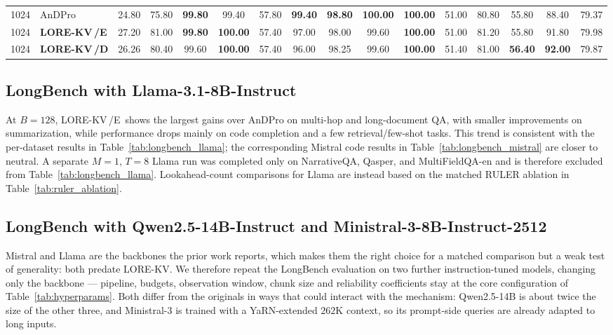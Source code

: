 \documentclass{article} %
\newcommand{\best}[1]{\textcolor{bestblue}{\textbf{#1}}}
\newcommand{\second}[1]{\textcolor{secondorange}{#1}}
\newcommand{\lorekvE}{LORE-KV\,/E}
\newcommand{\lorekvD}{LORE-KV\,/D}
\begin{document}
\begin{table}[p]
{\begin{tabular}{llcccccccccccccc}
1024 & AnDPro & 24.80 & 75.80 & \best{99.80} & \second{99.40} & \second{57.80} & \best{99.40} & \best{98.80} & \best{100.00} & \best{100.00} & 51.00 & 80.80 & \second{55.80} & 88.40 & 79.37 \\
1024 & \textbf{\lorekvE} & \second{27.20} & \second{81.00} & \best{99.80} & \best{100.00} & 57.40 & \second{97.00} & 98.00 & \second{99.60} & \best{100.00} & 51.00 & \second{81.20} & \second{55.80} & \second{91.80} & \second{79.98} \\
1024 & \textbf{\lorekvD} & 26.26 & 80.40 & \second{99.60} & \best{100.00} & 57.40 & 96.00 & \second{98.25} & \second{99.60} & \best{100.00} & \second{51.40} & 81.00 & \best{56.40} & \best{92.00} & 79.87 \\
\bottomrule
\end{tabular}%
}
\end{table}

\subsection{LongBench with Llama-3.1-8B-Instruct}
\label{app:llama_results}

At $B{=}128$, \lorekvE\ shows the largest gains over AnDPro on
multi-hop and long-document QA, with smaller improvements on
summarization, while performance drops mainly on code completion and
a few retrieval/few-shot tasks. This trend is consistent with the
per-dataset results in Table~\ref{tab:longbench_llama}; the
corresponding Mistral code results in
Table~\ref{tab:longbench_mistral} are closer to neutral. A separate
$M{=}1$, $T{=}8$ Llama run was completed only on NarrativeQA,
Qasper, and MultiFieldQA-en and is therefore excluded from
Table~\ref{tab:longbench_llama}. Lookahead-count comparisons for
Llama are instead based on the matched RULER ablation in
Table~\ref{tab:ruler_ablation}.



\subsection{LongBench with Qwen2.5-14B-Instruct and Ministral-3-8B-Instruct-2512}
\label{app:new_backbones}
\color{teal}

Mistral and Llama are the backbones the prior work reports, which makes them the
right choice for a matched comparison but a weak test of generality: both predate
LORE-KV. We therefore repeat the LongBench evaluation on two further
instruction-tuned models, changing only the backbone --- pipeline, budgets,
observation window, chunk size and reliability coefficients stay at the core
configuration of Table~\ref{tab:hyperparams}. Both differ from the originals in
ways that could interact with the mechanism: Qwen2.5-14B is about twice the size
of the other three, and Ministral-3 is trained with a YaRN-extended $262$K
context, so its prompt-side queries are already adapted to long inputs.
\end{document}
